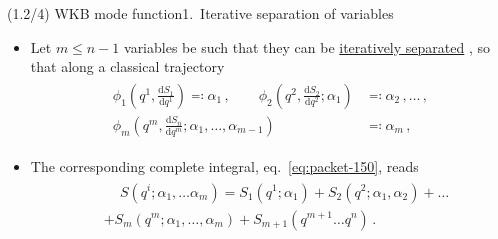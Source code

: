 \documentclass[mathserif]{beamer}
\newcommand{\rfun}[2]{#1\mathopen{}\left(#2\right)\mathclose{}}
\newcommand{\dif}{\mathrm{d}}
\begin{document}
\begin{frame}{(1.2/4) WKB mode function}{1.\ Iterative separation of variables}
\begin{itemize}
    \item Let $m \le n-1$ variables be such that they can be
    \underline{iteratively separated} , so that
    along a classical trajectory
\begin{align}
\begin{split}
    \rfun{\phi_1}{q^1, \tfrac{\dif S_1}{\dif q^1}} \eqqcolon \alpha_1\,,
    \qquad
    \rfun{\phi_2}{q^2, \tfrac{\dif S_2}{\dif q^2}; \alpha_1} &\eqqcolon \alpha_2\,,
    \ldots\,,\\
    \rfun{\phi_m}{q^m, \tfrac{\dif S_n}{\dif q^m}; \alpha_1,\ldots, \alpha_{m-1}} &\eqqcolon \alpha_m\,,
\end{split}
\label{eq:packet-200}
\end{align}
\item The corresponding complete integral, eq.\ \eqref{eq:packet-150}, reads
\begin{align}
\begin{split}
    &\quad\,\rfun{S}{q^i; \alpha_1, \ldots \alpha_m} = \rfun{S_1}{q^1; \alpha_1} + \rfun{S_2}{q^2; \alpha_1, \alpha_2} +
    \ldots
    \\
    &+ \rfun{S_m}{q^m; \alpha_1, \ldots, \alpha_m}
    +
    \rfun{S_{m+1}}{q^{m+1}\ldots q^n}\,. %
    \label{eq:packet-250}
\end{split}
\end{align}
\end{itemize}
\end{frame}
\end{document}
